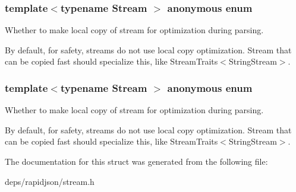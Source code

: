 \subsubsection[{\texorpdfstring{anonymous enum}{anonymous enum}}]{\setlength{\rightskip}{0pt plus 5cm}template$<$typename Stream $>$ anonymous enum}\hypertarget{struct_stream_traits_a6b076e3cff8a8c00ee76c453c5044fc0}{}\label{struct_stream_traits_a6b076e3cff8a8c00ee76c453c5044fc0}


Whether to make local copy of stream for optimization during parsing. 

By default, for safety, streams do not use local copy optimization. Stream that can be copied fast should specialize this, like Stream\+Traits$<$\+String\+Stream$>$. \subsubsection[{\texorpdfstring{anonymous enum}{anonymous enum}}]{\setlength{\rightskip}{0pt plus 5cm}template$<$typename Stream $>$ anonymous enum}\hypertarget{struct_stream_traits_a95fb9f6ece37dc34e032c9ef7217d851}{}\label{struct_stream_traits_a95fb9f6ece37dc34e032c9ef7217d851}


Whether to make local copy of stream for optimization during parsing. 

By default, for safety, streams do not use local copy optimization. Stream that can be copied fast should specialize this, like Stream\+Traits$<$\+String\+Stream$>$. 

The documentation for this struct was generated from the following file\+:\begin{DoxyCompactItemize}
\item 
deps/rapidjson/stream.\+h\end{DoxyCompactItemize}
